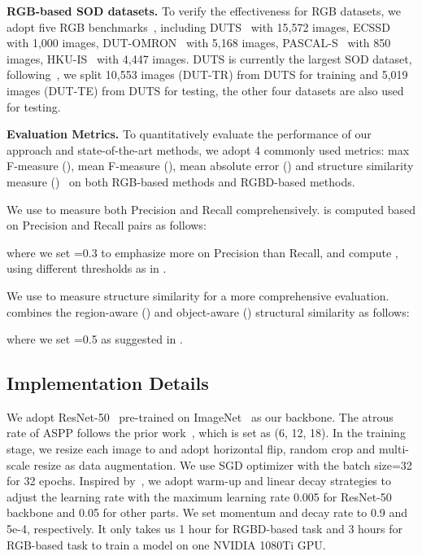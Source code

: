 \documentclass[sigconf]{acmart}
\begin{document}
\textbf{RGB-based SOD datasets.} To verify the effectiveness for RGB datasets, we adopt five RGB benchmarks~\cite{wang2017learning,yang2013saliency,yan2013hierarchical,li2014secrets,li2015visual}, including DUTS~\cite{wang2017learning} with 15,572 images, ECSSD~\cite{yan2013hierarchical} with 1,000 images, DUT-OMRON~\cite{yang2013saliency} with 5,168 images, PASCAL-S~\cite{li2014secrets} with 850 images, HKU-IS~\cite{li2015visual} with 4,447 images. DUTS is currently the largest SOD dataset, following~\cite{wang2017learning}, we split 10,553 images (DUT-TR) from DUTS for training and 5,019 images (DUT-TE) from DUTS for testing, the other four datasets are also used for testing.

\textbf{Evaluation Metrics.} To quantitatively evaluate the performance of our approach and state-of-the-art methods, we adopt 4 commonly used metrics: max F-measure (), mean F-measure (), mean absolute error () and structure similarity measure ()~\cite{fan2017structure} on both RGB-based methods and RGBD-based methods.

We use  to measure both Precision and Recall comprehensively.  is computed based on Precision and Recall pairs as follows:
 
 where we set =0.3 to emphasize more on Precision than Recall, and compute ,  using different thresholds as in \cite{borji2015salient}.
 
 We use  to measure structure similarity for a more comprehensive evaluation.  combines the region-aware () and object-aware () structural similarity as follows:
  
 where we set =0.5 as suggested in \cite{fan2017structure}.
 
\subsection{Implementation Details}

We adopt ResNet-50~\cite{he2016deep} pre-trained on ImageNet~\cite{deng2009imagenet} as our backbone. The atrous rate of ASPP follows the prior work~\cite{chen2017deeplab}, which is set as (6, 12, 18). In the training stage, we resize each image to  and adopt horizontal flip, random crop and multi-scale resize as data augmentation. We use SGD optimizer with the batch size=32 for 32 epochs. Inspired by~\cite{F3Net,chen2020global}, we adopt warm-up and linear decay strategies to adjust the learning rate with the maximum learning rate 0.005 for ResNet-50 backbone and 0.05 for other parts. We set momentum and decay rate to 0.9 and 5e-4, respectively. It only takes us 1 hour for RGBD-based task and 3 hours for RGB-based task to train a model on one NVIDIA 1080Ti GPU. 
\end{document}
